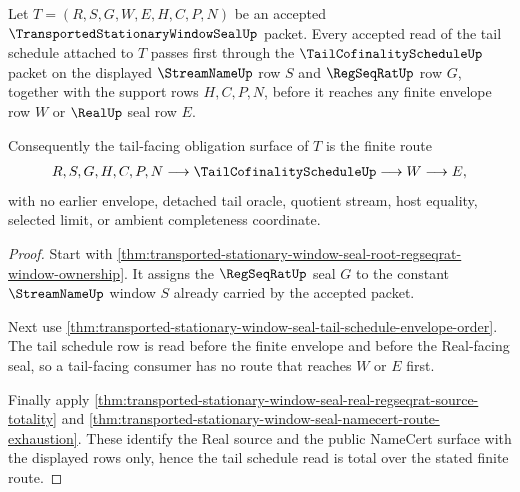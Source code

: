 \begin{theorem}
\label{thm:transported-stationary-window-seal-tail-cofinality-totality}
Let $T=(R,S,G,W,E,H,C,P,N)$ be an accepted $\TransportedStationaryWindowSealUp$ packet. Every accepted read of the tail schedule attached to $T$ passes first through the $\TailCofinalityScheduleUp$ packet on the displayed $\StreamNameUp$ row $S$ and $\RegSeqRatUp$ row $G$, together with the support rows $H,C,P,N$, before it reaches any finite envelope row $W$ or $\RealUp$ seal row $E$.

Consequently the tail-facing obligation surface of $T$ is the finite route
$$
\begin{aligned}
  R,S,G,H,C,P,N
  \longrightarrow
  \TailCofinalityScheduleUp
  \longrightarrow
  W
  \longrightarrow
  E,
\end{aligned}
$$
with no earlier envelope, detached tail oracle, quotient stream, host equality, selected limit, or ambient completeness coordinate.
\end{theorem}
\begin{proof}
Start with \autoref{thm:transported-stationary-window-seal-root-regseqrat-window-ownership}. It assigns the $\RegSeqRatUp$ seal $G$ to the constant $\StreamNameUp$ window $S$ already carried by the accepted packet.

Next use \autoref{thm:transported-stationary-window-seal-tail-schedule-envelope-order}. The tail schedule row is read before the finite envelope and before the Real-facing seal, so a tail-facing consumer has no route that reaches $W$ or $E$ first.

Finally apply \autoref{thm:transported-stationary-window-seal-real-regseqrat-source-totality} and \autoref{thm:transported-stationary-window-seal-namecert-route-exhaustion}. These identify the Real source and the public NameCert surface with the displayed rows only, hence the tail schedule read is total over the stated finite route.
\end{proof}

